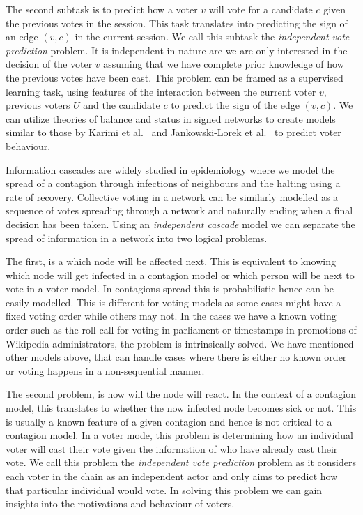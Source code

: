 The second subtask is to predict how a voter $v$ will vote for a candidate $c$ given the previous votes in the session.
This task translates into predicting the sign of an edge $(v,c)$ in the current session.
We call this subtask the \textit{independent vote prediction} problem.
It is independent in nature are we are only interested in the decision of the voter $v$ assuming that we have complete prior knowledge of how the previous votes have been cast.
This problem can be framed as a supervised learning task, using features of the interaction between the current voter $v$, previous voters $U$ and the candidate $c$ to predict the sign of the edge $(v,c)$.
We can utilize theories of balance and status in signed networks to create models similar to those by Karimi et al.\ \cite{karimi2019multicongress} and Jankowski-Lorek et al.\ \cite{jankowski-lorek2013MBSN} to predict voter behaviour.

\iffalse
{}
Information cascades are widely studied in epidemiology where we model the spread of a contagion through infections of neighbours and the halting using a rate of recovery.
Collective voting in a network can be similarly modelled as a sequence of votes spreading through a network and naturally ending when a final decision has been taken.
Using an \textit{independent cascade} model we can separate the spread of information in a network into two logical problems.

The first, is a which node will be affected next.
This is equivalent to knowing which node will get infected in a contagion model or which person will be next to vote in a voter model.
In contagions spread this is probabilistic hence can be easily modelled.
This is different for voting models as some cases might have a fixed voting order while others may not.
In the cases we have a known voting order such as the roll call for voting in parliament or timestamps in promotions of Wikipedia administrators, the problem is intrinsically solved.
We have mentioned other models above, that can handle cases where there is either no known order or voting happens in a non-sequential manner. 

The second problem, is how will the node will react.
In the context of a contagion model, this translates to whether the now infected node becomes sick or not.
This is usually a known feature of a given contagion and hence is not critical to a contagion model.
In a voter mode, this problem is determining how an individual voter will cast their vote given the information of who have already cast their vote.
We call this problem the \textit{independent vote prediction} problem as it considers each voter in the chain as an independent actor and only aims to predict how that particular individual would vote.
In solving this problem we can gain insights into the motivations and behaviour of voters. 

